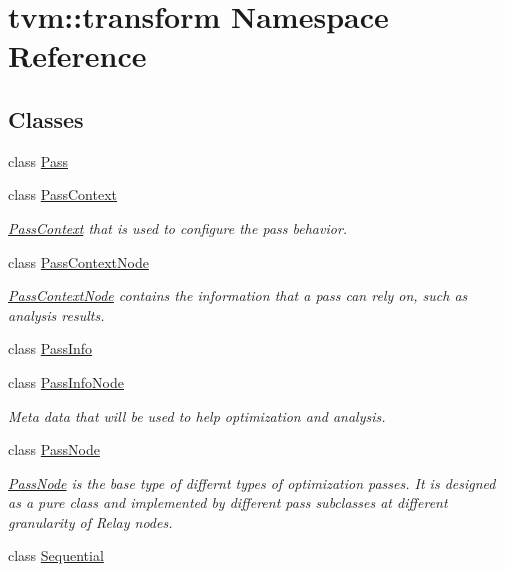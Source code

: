 \hypertarget{namespacetvm_1_1transform}{}\section{tvm\+:\+:transform Namespace Reference}
\label{namespacetvm_1_1transform}
\subsection*{Classes}
\begin{DoxyCompactItemize}
\item 
class \hyperlink{classtvm_1_1transform_1_1Pass}{Pass}
\item 
class \hyperlink{classtvm_1_1transform_1_1PassContext}{Pass\+Context}
\begin{DoxyCompactList}\small\item\em \hyperlink{classtvm_1_1transform_1_1PassContext}{Pass\+Context} that is used to configure the pass behavior. \end{DoxyCompactList}\item 
class \hyperlink{classtvm_1_1transform_1_1PassContextNode}{Pass\+Context\+Node}
\begin{DoxyCompactList}\small\item\em \hyperlink{classtvm_1_1transform_1_1PassContextNode}{Pass\+Context\+Node} contains the information that a pass can rely on, such as analysis results. \end{DoxyCompactList}\item 
class \hyperlink{classtvm_1_1transform_1_1PassInfo}{Pass\+Info}
\item 
class \hyperlink{classtvm_1_1transform_1_1PassInfoNode}{Pass\+Info\+Node}
\begin{DoxyCompactList}\small\item\em Meta data that will be used to help optimization and analysis. \end{DoxyCompactList}\item 
class \hyperlink{classtvm_1_1transform_1_1PassNode}{Pass\+Node}
\begin{DoxyCompactList}\small\item\em \hyperlink{classtvm_1_1transform_1_1PassNode}{Pass\+Node} is the base type of differnt types of optimization passes. It is designed as a pure class and implemented by different pass subclasses at different granularity of Relay nodes. \end{DoxyCompactList}\item 
class \hyperlink{classtvm_1_1transform_1_1Sequential}{Sequential}
\end{DoxyCompactItemize}
